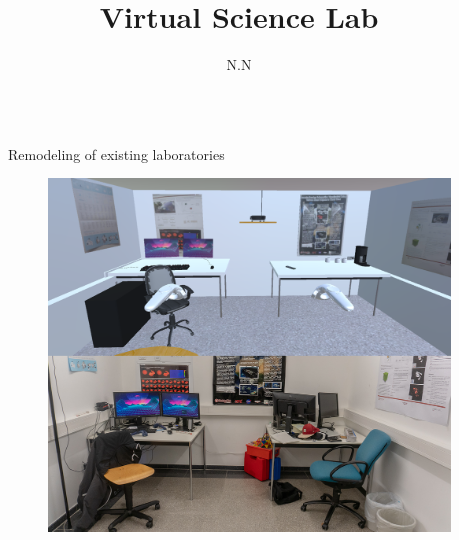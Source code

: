 \documentclass[final,hyperref={pdfpagelabels=false}]{beamer}
\title{\huge Virtual Science Lab}
\author{N.N}
\institute{Department of Computer Science and Microsystems Technology}
\begin{document}

\begin{frame}[t] %

\begin{columns}[t] %

\begin{column}{.02\textwidth}\end{column} %

\begin{column}{.465\textwidth} %


\begin{block}{Remodeling of existing laboratories}
    \begin{figure}
    	\centering
    	\includegraphics[width=0.95\linewidth]{labor_vgl}

    \end{figure}
    
    \vspace{20px}
\end{block}

\vspace{0.3cm}


\end{column}
\end{columns}
\end{frame}
\end{document}

